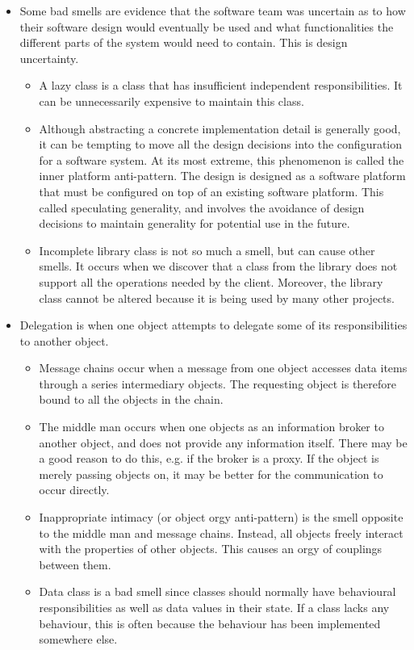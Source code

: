 \documentclass[a4paper, openany]{memoir}
\begin{document}
\begin{itemize}
    \item Some bad smells are evidence that the software team was uncertain as to how their software design would eventually be used and what functionalities the different parts of the system would need to contain. This is design uncertainty.
    \begin{itemize}
        \item A lazy class is a class that has insufficient independent responsibilities. It can be unnecessarily expensive to maintain this class. 
        \item Although abstracting a concrete implementation detail is generally good, it can be tempting to move all the design decisions into the configuration for a software system. At its most extreme, this phenomenon is called the inner platform anti-pattern. The design is designed as a software platform that must be configured on top of an existing software platform. This called speculating generality, and involves the avoidance of design decisions to maintain generality for potential use in the future.
        \item Incomplete library class is not so much a smell, but can cause other smells. It occurs when we discover that a class from the library does not support all the operations needed by the client. Moreover, the library class cannot be altered because it is being used by many other projects.
    \end{itemize}
    
    \item Delegation is when one object attempts to delegate some of its responsibilities to another object.
    \begin{itemize}
        \item Message chains occur when a message from one object accesses data items through a series intermediary objects. The requesting object is therefore bound to all the objects in the chain.
        \item The middle man occurs when one objects as an information broker to another object, and does not provide any information itself. There may be a good reason to do this, e.g. if the broker is a proxy. If the object is merely passing objects on, it may be better for the communication to occur directly.
        \item Inappropriate intimacy (or object orgy anti-pattern) is the smell opposite to the middle man and message chains. Instead, all objects freely interact with the properties of other objects. This causes an orgy of couplings between them.
        \item Data class is a bad smell since classes should normally have behavioural responsibilities as well as data values in their state. If a class lacks any behaviour, this is often because the behaviour has been implemented somewhere else.
    \end{itemize}
\end{itemize}
\end{document}
